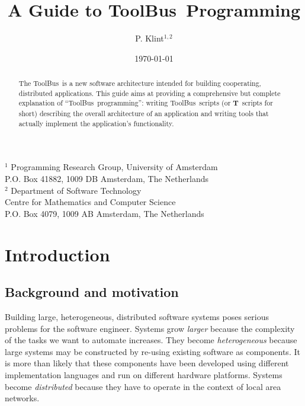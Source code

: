 \documentclass[twoside]{article} %
\begin{document}
\newcommand{\TB}{{\sc ToolBus}}
\newcommand{\T}{{\bf T}}
\newcommand{\spec}[1]{{\rm #1}}
\newcommand{\script}[1]{{\tt #1}}
\newcommand{\ASFSDF}{{\sc Asf+Sdf}}
\newcommand{\ASF}{{\sc Asf}}
\newcommand{\SDF}{{\sc Sdf}}
\newcommand{\GEL}{{\sc Gel}}
\newcommand{\iter}{\,^*\,}
\newcommand{\emp}[1]{{\em #1}}
\newcommand{\txttt}[1]{{\tt #1}}

%

\title{A Guide to \TB\ Programming\\
}
\author{P. Klint$^{1,2}$}
\date{\today}
\maketitle
\begin{center}
       {\footnotesize $^1$ Programming Research Group, University of Amsterdam\\
        P.O. Box 41882, 1009 DB Amsterdam, The Netherlands\\
        $^2$ Department of Software Technology\\
        Centre for Mathematics and Computer Science\\
        P.O. Box 4079, 1009 AB Amsterdam, The Netherlands}
\end{center}

\begin{abstract}
The \TB\ is a new software architecture intended for building
cooperating, distributed applications.  This guide aims at providing a
comprehensive but complete explanation of ``\TB\ programming'':
writing \TB{}ripts (or \T\ scripts for short) describing the overall architecture of an
application and writing tools that actually implement the application's
functionality.

\end{abstract}
\tableofcontents

\newpage

\section{Introduction}

\subsection{Background and motivation}
Building large, heterogeneous, distributed software systems poses
serious problems for the software engineer.  Systems grow {\em larger}
because the complexity of the tasks we want to automate
increases.  They become {\em heterogeneous} because large systems may be
constructed by re-using existing software as components.
It is more than likely that these components have been developed
using different implementation languages and run on different
hardware platforms.
Systems become {\em distributed} because they have to operate
in the context of local area networks.
\end{document}
